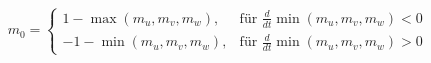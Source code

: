 \documentclass{article}
\begin{document}
	
	\[
	m_0 = \begin{cases} 
		1 - \max(m_u, m_v, m_w), & \text{für } \frac{d}{dt} \min(m_u, m_v, m_w) < 0 \\
		-1 - \min(m_u, m_v, m_w), & \text{für } \frac{d}{dt} \min(m_u, m_v, m_w) > 0
	\end{cases}
	\]
	
\end{document}

